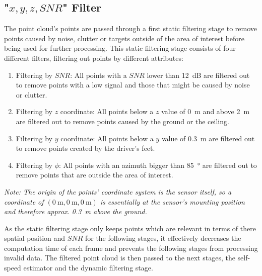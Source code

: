\subsection{"$x,y,z,SNR$" Filter}
The point cloud's points are passed through a first static filtering stage to remove points caused by noise, clutter or targets outside of the area of interest before being used for further processing.
This static filtering stage consists of four different filters, filtering out points by different attributes:
\begin{enumerate}
    \item Filtering by $SNR$: All points with a $SNR$ lower than \SI{12}{\deci\bel} are filtered out to remove points with a low signal and those that might be caused by noise or clutter.
    \item Filtering by $z$ coordinate: All points below a $z$ value of \SI{0}{\meter} and above \SI{2}{\meter} are filtered out to remove points caused by the ground or the ceiling.
    \item Filtering by $y$ coordinate: All points below a $y$ value of \SI{0.3}{\meter} are filtered out to remove points created by the driver's feet.
    \item Filtering by $\phi$: All points with an azimuth bigger than \SI{85}{\degree} are filtered out to remove points that are outside the area of interest.
\end{enumerate}
\textit{Note: The origin of the points' coordinate system is the sensor itself, so a coordinate of $(\SI{0}{\meter},\SI{0}{\meter},\SI{0}{\meter})$ is essentially at the sensor's mounting position and therefore approx. \SI{0.3}{\meter} above the ground.}
\par
As the static filtering stage only keeps points which are relevant in terms of there spatial position and $SNR$ for the following stages, it effectively decreases the computation time of each frame and prevents the following stages from processing invalid data.
The filtered point cloud is then passed to the next stages, the self-speed estimator and the dynamic filtering stage.


